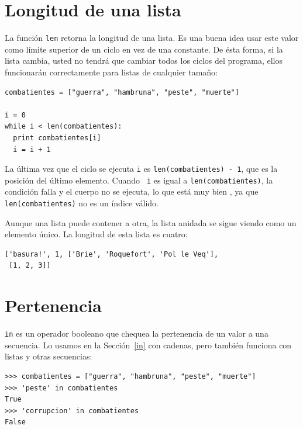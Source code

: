 \section{Longitud de una lista}

La función \texttt{len} retorna la longitud de una lista.  Es una buena
idea usar este valor como límite superior de un ciclo en vez de una
constante. De ésta forma, si la lista cambia, usted no tendrá que
cambiar todos los ciclos del programa, ellos funcionarán correctamente
para listas de cualquier tamaño:


\beforeverb
\begin{verbatim}
combatientes = ["guerra", "hambruna", "peste", "muerte"]

i = 0
while i < len(combatientes):
  print combatientes[i]
  i = i + 1
\end{verbatim}
\afterverb
%
La última vez que el ciclo se ejecuta \texttt{i} es \texttt{len(combatientes) - 1}, 
que es la posición del último  elemento.  Cuando {\tt
i} es igual a \texttt{len(combatientes)}, la condición falla y el cuerpo no se
ejecuta, lo que está muy bien , ya que \texttt{len(combatientes)} no es un 
índice válido.

Aunque una lista puede contener a otra, la lista anidada se sigue
viendo como un elemento único. La longitud de esta lista es cuatro:

\beforeverb
\begin{verbatim}
['basura!', 1, ['Brie', 'Roquefort', 'Pol le Veq'], 
 [1, 2, 3]]
\end{verbatim}
\afterverb
%


\section{Pertenencia}

\texttt{in} es un operador booleano que chequea la pertenencia de un valor
a una secuencia. Lo usamos en la Sección~\ref{in} con cadenas, pero también
funciona con listas y otras  secuencias:

\beforeverb
\begin{verbatim}
>>> combatientes = ["guerra", "hambruna", "peste", "muerte"]
>>> 'peste' in combatientes
True
>>> 'corrupcion' in combatientes
False
\end{verbatim}
\afterverb

